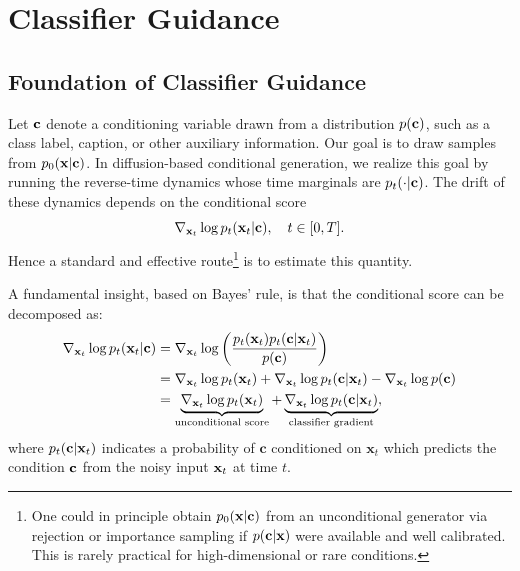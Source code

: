 \clearpage
\newpage


\section{Classifier Guidance}\label{sec:cg}

\subsection{Foundation of Classifier Guidance}
Let ${\mathbf{c}}$ denote a conditioning variable drawn from a distribution $p({\mathbf{c}})$, such as a class label, caption, or other auxiliary information. Our goal is to draw samples from $p_0({\mathbf{x}} | {\mathbf{c}})$. In diffusion-based conditional generation, we realize this goal by running the reverse-time dynamics whose time marginals are $p_t(\cdot | {\mathbf{c}})$. The drift of these dynamics depends on the conditional score
\[
\nabla_{{\mathbf{x}}_t}\log p_t({\mathbf{x}}_t | {\mathbf{c}}), \quad t \in [0,T].
\]
Hence a standard and effective route\footnote{One could in principle obtain $p_0({\mathbf{x}} | {\mathbf{c}})$ from an unconditional generator via rejection or importance sampling if $p({\mathbf{c}} | {\mathbf{x}})$ were available and well calibrated. This is rarely practical for high-dimensional or rare conditions.} is to estimate this quantity.


A fundamental insight, based on Bayes' rule, is that the conditional score can be decomposed as:
\begin{align}
\nabla_{{\mathbf{x}}_t} \log p_t({\mathbf{x}}_t | {\mathbf{c}}) 
&= \nabla_{{\mathbf{x}}_t} \log \left( \frac{p_t({\mathbf{x}}_t)   p_t({\mathbf{c}} | {\mathbf{x}}_t)}{p({\mathbf{c}})} \right) \nonumber \\
&= \nabla_{{\mathbf{x}}_t} \log p_t({\mathbf{x}}_t) + \nabla_{{\mathbf{x}}_t} \log p_t({\mathbf{c}} | {\mathbf{x}}_t) - \nabla_{{\mathbf{x}}_t} \log p({\mathbf{c}}) \nonumber \\
&= \underbrace{\nabla_{{\mathbf{x}}_t} \log p_t({\mathbf{x}}_t)}_{\text{unconditional score}} 
+ \underbrace{\nabla_{{\mathbf{x}}_t} \log p_t({\mathbf{c}} | {\mathbf{x}}_t)}_{\text{classifier gradient}}, \label{eq:cg_bayes}
\end{align}
where $p_t({\mathbf{c}} | {\mathbf{x}}_t)$ indicates a probability of $\mathbf{c}$ conditioned on $\mathbf{x}_{t}$ which predicts the condition ${\mathbf{c}}$ from the noisy input ${\mathbf{x}}_t$ at time $t$. 


